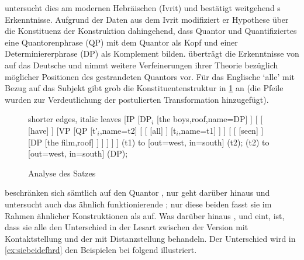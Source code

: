 \citet{shlonsky1991} untersucht dies am modernen Hebräischen (Ivrit) und
bestätigt weitgehend \citeauthor{sportiche1988}s Erkenntnisse. Aufgrund der
Daten aus dem Ivrit modifiziert er  Hypothese über die
Konstituenz der Konstruktion dahingehend, dass Quantor und Quantifiziertes eine
Quantorenphrase (QP) mit dem Quantor als Kopf und einer Determiniererphrase
(DP) als Komplement bilden. \citet{merchant1996} überträgt die Erkenntnisse von
\citet{sportiche1988,shlonsky1991} auf das Deutsche und nimmt weitere
Verfeinerungen ihrer Theorie bezüglich möglicher Positionen des gestrandeten
Quantors vor. Für das Englische  `alle' mit Bezug auf das Subjekt
gibt \citet[180]{merchant1996} grob die Konstituentenstruktur in \cref{fig:qfgg}
an (die Pfeile wurden zur Verdeutlichung der postulierten Transformation
hinzugefügt).

\begin{figure}
	\begin{forest} shorter edges, italic leaves
	[IP
		[DP$_i$
			[{the boys},roof,name=DP]
		]
		[
			[
				[have]
			]
			[VP
				[QP
					[t′$_i$,name=t2]
					[
						[
							[all]
						]
						[t$_i$,name=t1]
					]
				]
				[
					[
						[seen]
					]
					[DP
						[{the film},roof]
					]
				]
			]
		]
	]
	 (t1) to [out=west, in=south] (t2);
	 (t2) to [out=west, in=south] (DP);
	\end{forest}
	\caption{Analyse des Satzes }
	\label{fig:qfgg}
\end{figure}

\textcites{sportiche1988,shlonsky1991,merchant1996} beschränken sich sämtlich
auf den Quantor , nur \citet{pittner1995} geht darüber hinaus und
untersucht auch das ähnlich funktionierende ; nur diese beiden fasst
sie im Rahmen ähnlicher Konstruktionen als  auf. Was
darüber hinaus \citeauthor{shlonsky1991}, \citeauthor{pittner1995} und
\citeauthor{merchant1996} eint, ist, dass sie alle den Unterschied in der
Lesart zwischen der Version mit Kontaktstellung und der mit Distanzstellung
behandeln. Der Unterschied wird in \cref{ex:siebeidefhrd} den Beispielen bei
\citet[30--31]{pittner1995} folgend illustriert.

